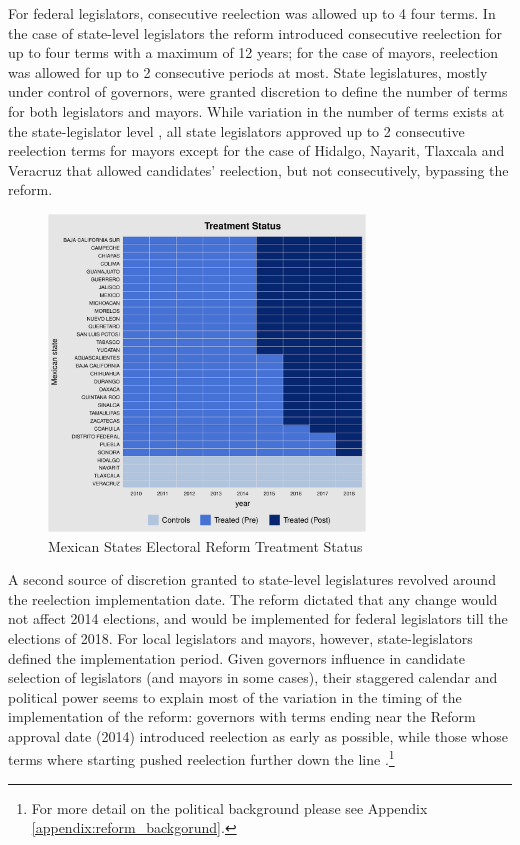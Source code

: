 \documentclass[12pt]{amsart}
\numberwithin{equation}{section}
\theoremstyle{definition}
\theoremstyle{definition}
\theoremstyle{definition}
\begin{document}
For federal legislators, consecutive reelection was allowed up to 4 four terms. In the case of state-level legislators the reform introduced consecutive reelection for up to four terms with a maximum of 12 years; for the case of mayors, reelection was allowed for up to 2 consecutive periods at most. State legislatures, mostly under control of governors, were granted discretion to define the number of terms for both legislators and mayors. While variation in the number of terms exists at the state-legislator level \citep{motolinia_2020}, all state legislators approved up to 2 consecutive reelection terms for mayors except for the case of Hidalgo, Nayarit, Tlaxcala and Veracruz that allowed candidates' reelection, but not consecutively, bypassing the reform.  

\begin{figure}[H]   
\centering 
\caption{Mexican States Electoral Reform Treatment Status}
\label{fig:treatment_status}
\includegraphics[width=0.75\textwidth]{Figures/reform_treatmentstatus.pdf}     
\captionsetup{justification=centering} 
\end{figure}   

 
A second source of discretion granted to state-level legislatures revolved around the reelection implementation date. The reform dictated that any change would not affect 2014 elections, and would be implemented for federal legislators till the elections of 2018. For local legislators and mayors, however, state-legislators defined the implementation period. Given governors influence in candidate selection of legislators (and mayors in some cases), their staggered calendar and political power seems to explain most of the variation in the timing of the implementation of the reform: governors with terms ending near the Reform approval date (2014) introduced reelection as early as possible, while those whose terms where starting pushed reelection further down the line \citep{motolinia_2020}.\footnote{For more detail on the political background please see Appendix \ref{appendix:reform_backgorund}.}
   
\end{document}
